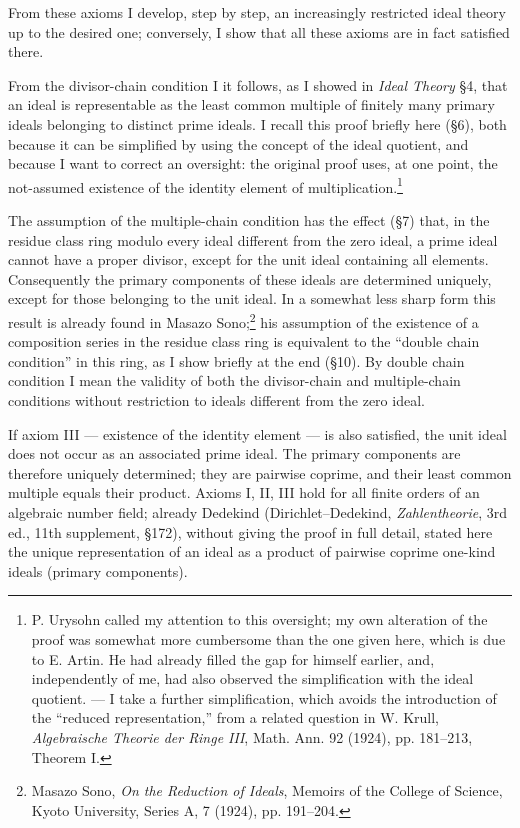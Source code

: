 \documentclass[11pt]{article}
\begin{document}
From these axioms I develop, step by step, an increasingly restricted ideal theory
up to the desired one; conversely, I show that all these axioms are in fact satisfied
there.

From the divisor-chain condition I it follows, as I showed in \emph{Ideal Theory}
§4, that an ideal is representable as the least common multiple of finitely many
primary ideals belonging to distinct prime ideals. I recall this proof briefly here
(§6), both because it can be simplified by using the concept of the ideal quotient,
and because I want to correct an oversight: the original proof uses, at one point,
the not-assumed existence of the identity element of multiplication.\footnote{P.
Urysohn called my attention to this oversight; my own alteration of the proof was
somewhat more cumbersome than the one given here, which is due to E. Artin.
He had already filled the gap for himself earlier, and, independently of me, had also
observed the simplification with the ideal quotient. — I take a further simplification,
which avoids the introduction of the “reduced representation,” from a related question
in W. Krull, \emph{Algebraische Theorie der Ringe III}, Math. Ann. 92 (1924),
pp. 181--213, Theorem I.}

The assumption of the multiple-chain condition has the effect (§7) that, in the residue
class ring modulo every ideal different from the zero ideal, a prime ideal cannot have
a proper divisor, except for the unit ideal containing all elements. Consequently the
primary components of these ideals are determined uniquely, except for those
belonging to the unit ideal. In a somewhat less sharp form this result is already
found in Masazo Sono;\footnote{Masazo Sono, \emph{On the Reduction of Ideals},
Memoirs of the College of Science, Kyoto University, Series A, 7 (1924),
pp. 191--204.} his assumption of the existence of a composition series in the residue
class ring is equivalent to the “double chain condition” in this ring, as I show briefly
at the end (§10). By double chain condition I mean the validity of both the divisor-chain
and multiple-chain conditions without restriction to ideals different from the zero ideal.

If axiom III — existence of the identity element — is also satisfied, the unit ideal
does not occur as an associated prime ideal. The primary components are therefore
uniquely determined; they are pairwise coprime, and their least common multiple
equals their product. Axioms I, II, III hold for all finite orders of an algebraic
number field; already Dedekind (Dirichlet--Dedekind, \emph{Zahlentheorie}, 3rd ed.,
11th supplement, §172), without giving the proof in full detail, stated here the
unique representation of an ideal as a product of pairwise coprime one-kind ideals
(primary components).
\end{document}
